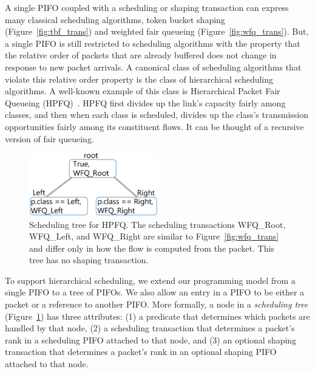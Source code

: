 A single PIFO coupled with a scheduling or shaping transaction can express many
classical scheduling algorithms, \eg token bucket shaping
(Figure~\ref{fig:tbf_trans}) and weighted fair queueing
(Figure~\ref{fig:wfq_trans}). But, a single PIFO is still restricted to
scheduling algorithms with the property that the relative order of packets that
are already buffered does not change in response to new packet arrivals. A
canonical class of scheduling algorithms that violate this relative order
property is the class of hierarchical scheduling algorithms. A well-known
example of this class is Hierarchical Packet Fair Queueing (HPFQ)~\cite{hpfq}.
HPFQ first divides up the link's capacity fairly among classes, and then when
each class is scheduled, divides up the class's transmission opportunities
fairly among its constituent flows. It can be thought of a recursive version of
fair queueing.

\begin{figure}[!t]
\centering
\includegraphics[width=0.5\textwidth]{pifo_hpfq_program.pdf}
\caption{Scheduling tree for HPFQ. The scheduling transactions WFQ\_Root,
WFQ\_Left, and WFQ\_Right are similar to Figure~\ref{fig:wfq_trans} and differ
only in how the flow is computed from the packet. This tree has no shaping
transaction.}
\label{fig:scheduling_tree}
\end{figure}

To support hierarchical scheduling, we extend our programming model from a
single PIFO to a tree of PIFOs. We also allow an entry in a PIFO to be either a
packet or a reference to another PIFO. More formally, a node in a {\em
scheduling tree} (Figure~\ref{fig:scheduling_tree}) has three attributes: (1) a
predicate that determines which packets are handled by that node, (2) a
scheduling transaction that determines a packet's rank in a scheduling PIFO
attached to that node, and (3) an optional shaping transaction that determines
a packet's rank in an optional shaping PIFO attached to that node.

